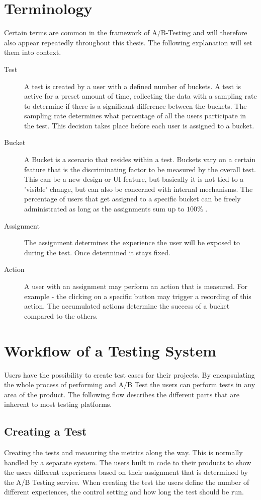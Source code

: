 \documentclass[main.tex]{subfiles}
\begin{document}
\section{Terminology}
Certain terms are common in the framework of A/B-Testing and will therefore also appear repeatedly throughout this thesis. The following explanation will set them into context.
\begin{description}
\item[Test]
A test is created by a user with a defined number of buckets. A test is active for a preset amount of time, collecting the data with a sampling rate to determine if there is a significant difference between the buckets. The sampling rate determines what percentage of all the users participate in the test. This decision takes place before each user is assigned to a bucket.
\item[Bucket]
A Bucket is a scenario that resides within a test. Buckets vary on a certain feature that is the discriminating factor to be measured by the overall test. This can be a new design or UI-feature, but basically it is not tied to a 'visible' change, but can also be concerned with internal mechanisms. The percentage of users that get assigned to a specific bucket can be freely administrated as long as the assignments sum up to $100\%$ .
\item[Assignment]
The assignment determines the experience the user will be exposed to during the test. Once determined it stays fixed.
\item[Action]
A user with an assignment may perform an action that is measured. For example - the clicking on a specific button may trigger a recording of this action. The accumulated actions determine the success of a bucket compared to the others. 
\end{description}
\section{Workflow of a Testing System}
Users have the possibility to create test cases for their projects. By encapsulating the whole process of performing and A/B Test the users can perform tests in any area of the product. The following flow describes the different parts that are inherent to most testing platforms.
\subsection{Creating a Test} 
Creating the tests and measuring the metrics along the way. This is normally handled by a separate system. The users built in code to their products to show the users different experiences based on their assignment that is determined by the A/B Testing service. When creating the test the users define the number of different experiences, the control setting and how long the test should be run.
\end{document}

